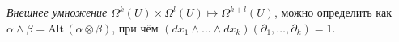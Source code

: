 \begin{to_def} 
    \textit{Внешнее умножение} $\Omega^k(U) \times \Omega^l (U) \mapsto \Omega^{k+l} (U)$, можно определить как $\alpha \wedge \beta = \text{Alt}\, (\alpha \otimes \beta)$, при чём $(dx_1 \wedge \ldots \wedge dx_k)(\partial_1, \ldots, \partial_k) = 1$.
\end{to_def}

